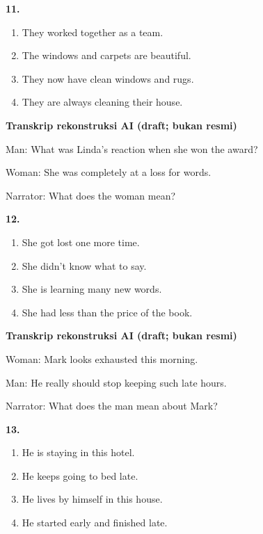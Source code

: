 \documentclass[12pt]{article}
\begin{document}
\noindent\textbf{11.}
\begin{enumerate}[label=(\Alph*),leftmargin=*,itemsep=0.2em]
\item They worked together as a team.
\item The windows and carpets are beautiful.
\item They now have clean windows and rugs.
\item They are always cleaning their house.
\end{enumerate}
\par
\vspace{0.25\baselineskip}
\begin{exampleblock}
\textbf{Transkrip rekonstruksi AI (draft; bukan resmi)}\par
Man: What was Linda's reaction when she won the award?\par
Woman: She was completely at a loss for words.\par
Narrator: What does the woman mean?\par
\end{exampleblock}
\noindent\textbf{12.}
\begin{enumerate}[label=(\Alph*),leftmargin=*,itemsep=0.2em]
\item She got lost one more time.
\item She didn't know what to say.
\item She is learning many new words.
\item She had less than the price of the book.
\end{enumerate}
\par
\vspace{0.25\baselineskip}
\begin{exampleblock}
\textbf{Transkrip rekonstruksi AI (draft; bukan resmi)}\par
Woman: Mark looks exhausted this morning.\par
Man: He really should stop keeping such late hours.\par
Narrator: What does the man mean about Mark?\par
\end{exampleblock}
\noindent\textbf{13.}
\begin{enumerate}[label=(\Alph*),leftmargin=*,itemsep=0.2em]
\item He is staying in this hotel.
\item He keeps going to bed late.
\item He lives by himself in this house.
\item He started early and finished late.
\end{enumerate}
\end{document}
